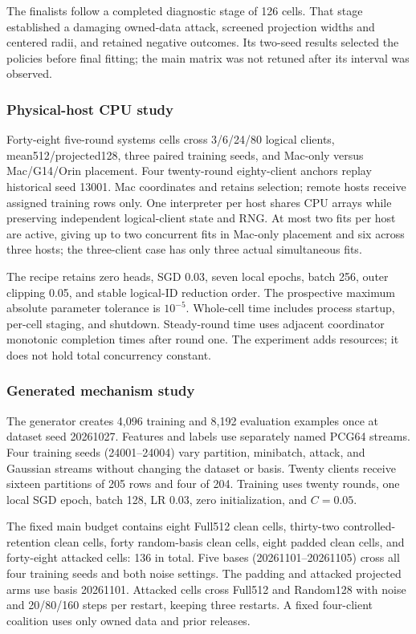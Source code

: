 \documentclass[conference,letterpaper]{IEEEtran}
\begin{document}
The finalists follow a completed diagnostic stage of 126 cells. That stage established a damaging owned-data attack, screened projection widths and centered radii, and retained negative outcomes. Its two-seed results selected the policies before final fitting; the main matrix was not retuned after its interval was observed.

\subsubsection{Physical-host CPU study}
Forty-eight five-round systems cells cross 3/6/24/80 logical clients, mean512/projected128, three paired training seeds, and Mac-only versus Mac/G14/Orin placement. Four twenty-round eighty-client anchors replay historical seed 13001. Mac coordinates and retains selection; remote hosts receive assigned training rows only. One interpreter per host shares CPU arrays while preserving independent logical-client state and RNG. At most two fits per host are active, giving up to two concurrent fits in Mac-only placement and six across three hosts; the three-client case has only three actual simultaneous fits.

The recipe retains zero heads, SGD 0.03, seven local epochs, batch 256, outer clipping 0.05, and stable logical-ID reduction order. The prospective maximum absolute parameter tolerance is $10^{-5}$. Whole-cell time includes process startup, per-cell staging, and shutdown. Steady-round time uses adjacent coordinator monotonic completion times after round one. The experiment adds resources; it does not hold total concurrency constant.

\subsubsection{Generated mechanism study}
The generator creates 4,096 training and 8,192 evaluation examples once at dataset seed 20261027. Features and labels use separately named PCG64 streams. Four training seeds (24001--24004) vary partition, minibatch, attack, and Gaussian streams without changing the dataset or basis. Twenty clients receive sixteen partitions of 205 rows and four of 204. Training uses twenty rounds, one local SGD epoch, batch 128, LR 0.03, zero initialization, and $C=0.05$.

The fixed main budget contains eight Full512 clean cells, thirty-two controlled-retention clean cells, forty random-basis clean cells, eight padded clean cells, and forty-eight attacked cells: 136 in total. Five bases (20261101--20261105) cross all four training seeds and both noise settings. The padding and attacked projected arms use basis 20261101. Attacked cells cross Full512 and Random128 with noise and 20/80/160 steps per restart, keeping three restarts. A fixed four-client coalition uses only owned data and prior releases.
\end{document}
